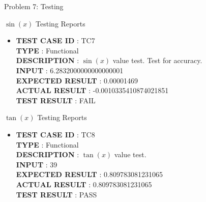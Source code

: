\documentclass[a4paper,12pt]{article}
\begin{document}
\begin{section}{Problem 7: Testing}
\begin{subsubsection}{$\sin(x)$ Testing Reports}
\begin{itemize}
\item \textbf{TEST CASE ID} \hspace{1.25cm} : TC7  \\
\textbf{TYPE } \hspace{3.15cm}  : Functional\\
\textbf{DESCRIPTION }\hspace{1.25cm} : $\sin(x)$ value test. Test for accuracy. \\
\textbf{INPUT} \hspace{3.05cm} :  6.2832000000000000001 \\
\textbf{EXPECTED RESULT} \hspace{0.01cm} : 0.00001469 \\
\textbf{ACTUAL RESULT} \hspace{0.6cm} : -0.0010335410874021851 \\
\textbf{TEST RESULT} \hspace{1.40cm} : FAIL \\

\end{itemize}
\end{subsubsection}
\vspace{1cm}

\begin{subsubsection}{$\tan(x)$ Testing Reports}
\begin{itemize}
\item \textbf{TEST CASE ID} \hspace{1.25cm} : TC8  \\
\textbf{TYPE } \hspace{3.15cm}  : Functional\\
\textbf{DESCRIPTION }\hspace{1.25cm} : $\tan(x)$ value test. \\
\textbf{INPUT} \hspace{3.05cm} :  39 \\
\textbf{EXPECTED RESULT} \hspace{0.01cm} : 0.809783081231065 \\
\textbf{ACTUAL RESULT} \hspace{0.6cm} : 0.809783081231065 \\
\textbf{TEST RESULT} \hspace{1.40cm} : PASS \\


\end{itemize}
\end{subsubsection}
\end{section}
\end{document}
